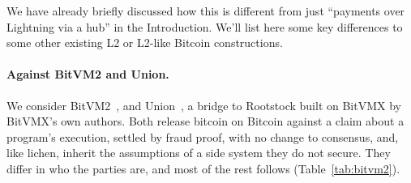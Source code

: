\documentclass[11pt]{article}
\begin{document}
We have already briefly discussed how this is different from just ``payments over Lightning via a hub'' in the Introduction. We'll list here some key differences to some other existing L2 or L2-like Bitcoin constructions.

\paragraph{Against BitVM2 and Union.} We consider BitVM2~\cite{bitvm2usenix}, and
Union~\cite{union}, a bridge to Rootstock built on BitVMX by BitVMX's
own authors. Both release bitcoin on Bitcoin against a claim about
a program's execution, settled by fraud proof, with no change to
consensus, and, like lichen, inherit the assumptions of a side system they
do not secure. They differ in who the parties are, and most of the rest
follows (Table~\ref{tab:bitvm2}).
\end{document}
